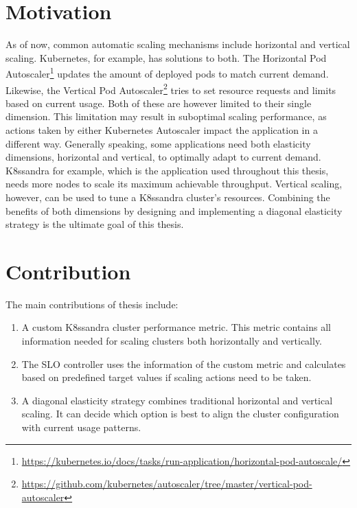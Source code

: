 \section{Motivation}
\label{sec:motivation}

As of now, common automatic scaling mechanisms include horizontal and vertical scaling. Kubernetes, for example, has solutions to both. The Horizontal Pod Autoscaler\footnote{\raggedright\url{https://kubernetes.io/docs/tasks/run-application/horizontal-pod-autoscale/}} updates the amount of deployed pods to match current demand. Likewise, the Vertical Pod Autoscaler\footnote{\raggedright\url{https://github.com/kubernetes/autoscaler/tree/master/vertical-pod-autoscaler}} tries to set resource requests and limits based on current usage. Both of these are however limited to their single dimension. This limitation may result in suboptimal scaling performance, as actions taken by either Kubernetes Autoscaler impact the application in a different way. Generally speaking, some applications need both elasticity dimensions, horizontal and vertical, to optimally adapt to current demand. K8ssandra for example, which is the application used throughout this thesis, needs more nodes to scale its maximum achievable throughput. Vertical scaling, however, can be used to tune a K8ssandra cluster's resources. Combining the benefits of both dimensions by designing and implementing a diagonal elasticity strategy is the ultimate goal of this thesis.

\section{Contribution}
\label{sec:contribution}

The main contributions of thesis include:

\begin{enumerate}
    \item A custom K8ssandra cluster performance metric. This metric contains all information needed for scaling clusters both horizontally and vertically.

    \item The SLO controller uses the information of the custom metric and calculates based on predefined target values if scaling actions need to be taken.

    \item A diagonal elasticity strategy combines traditional horizontal and vertical scaling. It can decide which option is best to align the cluster configuration with current usage patterns.
\end{enumerate}


